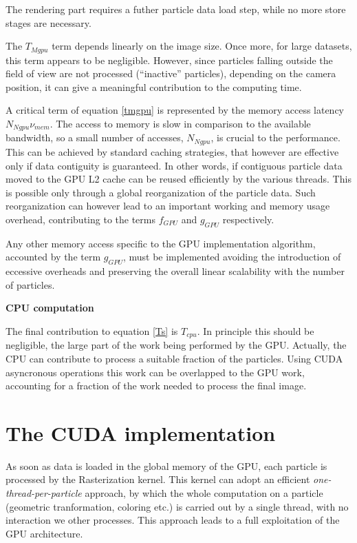 \documentclass[11pt]{article}
\begin{document}
The rendering part requires a futher particle data load step, while no more store 
stages are necessary.

The $T_{Mgpu}$ term depends linearly on the image size. Once more, 
for large datasets, this term appears to be negligible. However, since
particles falling outside the field of view are not processed (``inactive'' particles),
depending on the camera position, it can give a meaningful contribution to
the computing time.

A critical term of equation \eqref{tmgpu} is represented by the memory access
latency $N_{Ngpu} \nu_{mem}$. The access to memory is slow in comparison to
the available bandwidth, so a small number of accesses, $N_{Ngpu}$, is crucial
to the performance. This can be achieved by standard caching strategies, that
however are effective only if data contiguity is guaranteed. In other words,
if contiguous particle data moved to the GPU L2 cache can be reused efficiently
by the various threads. This is possible only through a global reorganization 
of the particle data. Such reorganization can however lead to an important
working and memory usage overhead, contributing to the terms $f_{GPU}$ and
$g_{GPU}$ respectively. 

Any other memory access specific to the GPU implementation algorithm,
accounted by the term $g_{GPU}$, must be implemented 
avoiding the introduction of eccessive overheads and preserving the overall
linear scalability with the number of particles.

\medskip
\noindent
{\bf CPU computation}

The final contribution to equation \eqref{Ts} is $T_{cpu}$. In principle this should be negligible, 
the large part of the work being performed by the GPU. Actually, the CPU
can contribute to process a suitable fraction of the particles. Using
CUDA asyncronous operations this work can be overlapped 
to the GPU work, accounting for a fraction of the work needed to 
process the final image.

\section{The CUDA implementation}
\label{sec:implementation}

As soon as data is loaded in the global memory of the GPU, each particle is processed 
by the Rasterization kernel. This kernel can adopt an efficient  
{\it one-thread-per-particle} approach, by which the whole computation on 
a particle (geometric tranformation, coloring etc.) is carried out
by a single thread, with no interaction we other processes.  
This approach leads to a full exploitation of the GPU architecture. 
\end{document}

